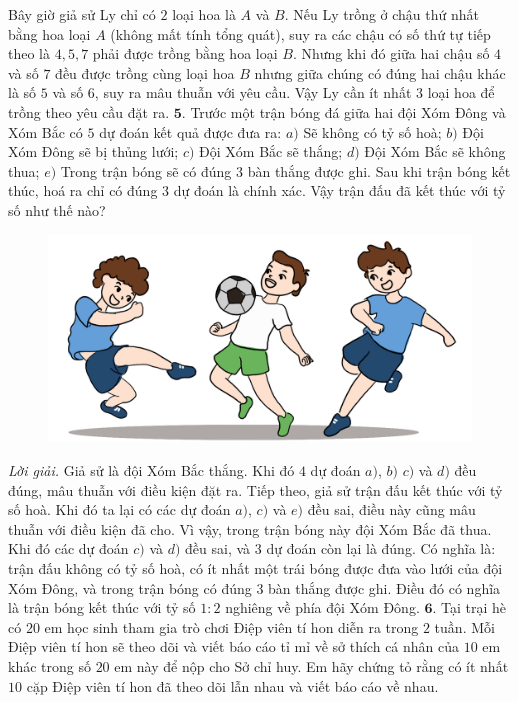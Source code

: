 \begin{multicols}{2}
	\vskip 0.1cm
	Bây giờ giả sử Ly chỉ có $2$ loại hoa là $A$ và $B$. Nếu Ly trồng ở chậu thứ nhất bằng hoa loại $A$ (không mất tính tổng quát), suy ra các chậu có số thứ tự tiếp theo là $4, 5, 7$ phải được trồng bằng hoa loại $B$. Nhưng khi đó giữa hai chậu số $4$ và số $7$ đều được trồng cùng loại hoa $B$ nhưng giữa chúng có đúng hai chậu khác là số $5$ và số $6$, suy ra mâu thuẫn với yêu cầu.
	\vskip 0.1cm
	Vậy Ly cần ít nhất $3$ loại hoa để trồng theo yêu cầu đặt ra.
	 \vskip 0.1cm
	$\pmb{5.}$ Trước một trận bóng đá giữa hai đội Xóm Đông và Xóm Bắc có $5$ dự đoán kết quả được đưa ra:
	\vskip 0.1cm
	$a)$	Sẽ không có tỷ số hoà;
	\vskip 0.1cm
	$b)$	Đội Xóm Đông sẽ bị thủng lưới;
	\vskip 0.1cm
	$c)$	Đội Xóm Bắc sẽ thắng;
	\vskip 0.1cm
	$d)$	Đội Xóm Bắc sẽ không thua;
	\vskip 0.1cm
	$e)$	Trong trận bóng sẽ có đúng $3$ bàn thắng được ghi.
	\vskip 0.1cm
	Sau khi trận bóng kết thúc, hoá ra chỉ có đúng $3$ dự đoán là chính xác. Vậy trận đấu đã kết thúc với tỷ số như thế nào?
	\begin{figure}[H]
		\centering
		\captionsetup{labelformat= empty, justification=centering}
		\includegraphics[width=0.85\linewidth]{Pi7_bai5}
		\vspace*{-10pt}
	\end{figure}
	\textit{Lời giải.} Giả sử là đội Xóm Bắc thắng. Khi đó $4$ dự đoán $a)$, $b)$ $c)$ và $d)$ đều đúng, mâu thuẫn với điều kiện đặt ra.
	\vskip 0.1cm
	Tiếp theo, giả sử trận đấu kết thúc với tỷ số hoà. Khi đó ta lại có các dự đoán $a)$, $c)$ và $e)$ đều sai, điều này cũng mâu thuẫn với điều kiện đã cho.
	\vskip 0.1cm
	Vì vậy, trong trận bóng này đội Xóm Bắc đã thua. Khi đó các dự đoán $c)$ và $d)$ đều sai, và $3$ dự đoán còn lại là đúng. Có nghĩa là: trận đấu không có tỷ số hoà, có ít nhất một trái bóng được đưa vào lưới của đội Xóm Đông, và trong trận bóng có đúng $3$ bàn thắng được ghi. Điều đó có nghĩa là trận bóng kết thúc với tỷ số $1:2$ nghiêng về phía đội Xóm Đông.
	\vskip 0.1cm
	$\pmb{6.}$ 	Tại trại hè có $20$ em học sinh tham gia trò chơi Điệp viên tí hon diễn ra trong $2$ tuần. Mỗi Điệp viên tí hon sẽ theo dõi và viết báo cáo tỉ mỉ về sở thích cá nhân của $10$ em khác trong số $20$ em này để nộp cho Sở chỉ huy. Em hãy chứng tỏ rằng có ít nhất $10$ cặp Điệp viên tí hon đã theo dõi lẫn nhau và viết báo cáo về nhau.

\end{multicols}
